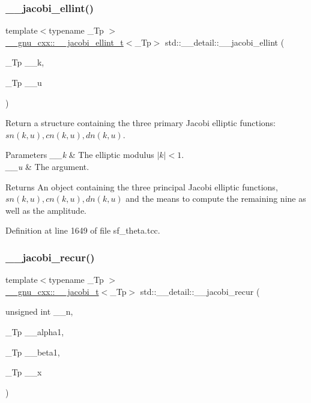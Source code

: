 \subsubsection{\texorpdfstring{\+\_\+\+\_\+jacobi\+\_\+ellint()}{\_\_jacobi\_ellint()}}
{\footnotesize\ttfamily template$<$typename \+\_\+\+Tp $>$ \\
\hyperlink{struct____gnu__cxx_1_1____jacobi__ellint__t}{\+\_\+\+\_\+gnu\+\_\+cxx\+::\+\_\+\+\_\+jacobi\+\_\+ellint\+\_\+t}$<$\+\_\+\+Tp$>$ std\+::\+\_\+\+\_\+detail\+::\+\_\+\+\_\+jacobi\+\_\+ellint (\begin{DoxyParamCaption}\item[{\+\_\+\+Tp}]{\+\_\+\+\_\+k,  }\item[{\+\_\+\+Tp}]{\+\_\+\+\_\+u }\end{DoxyParamCaption})}

Return a structure containing the three primary Jacobi elliptic functions\+: $ sn(k, u), cn(k, u), dn(k, u) $.


\begin{DoxyParams}{Parameters}
{\em \+\_\+\+\_\+k} & The elliptic modulus $ |k| < 1 $. \\
\hline
{\em \+\_\+\+\_\+u} & The argument. \\
\hline
\end{DoxyParams}
\begin{DoxyReturn}{Returns}
An object containing the three principal Jacobi elliptic functions, $ sn(k, u), cn(k, u), dn(k, u) $ and the means to compute the remaining nine as well as the amplitude. 
\end{DoxyReturn}


Definition at line 1649 of file sf\+\_\+theta.\+tcc.

\mbox{\label{namespacestd_1_1____detail_a35edf888e09012d7059e690507ef42ad}} 
\subsubsection{\texorpdfstring{\+\_\+\+\_\+jacobi\+\_\+recur()}{\_\_jacobi\_recur()}}
{\footnotesize\ttfamily template$<$typename \+\_\+\+Tp $>$ \\
\hyperlink{struct____gnu__cxx_1_1____jacobi__t}{\+\_\+\+\_\+gnu\+\_\+cxx\+::\+\_\+\+\_\+jacobi\+\_\+t}$<$\+\_\+\+Tp$>$ std\+::\+\_\+\+\_\+detail\+::\+\_\+\+\_\+jacobi\+\_\+recur (\begin{DoxyParamCaption}\item[{unsigned int}]{\+\_\+\+\_\+n,  }\item[{\+\_\+\+Tp}]{\+\_\+\+\_\+alpha1,  }\item[{\+\_\+\+Tp}]{\+\_\+\+\_\+beta1,  }\item[{\+\_\+\+Tp}]{\+\_\+\+\_\+x }\end{DoxyParamCaption})}

